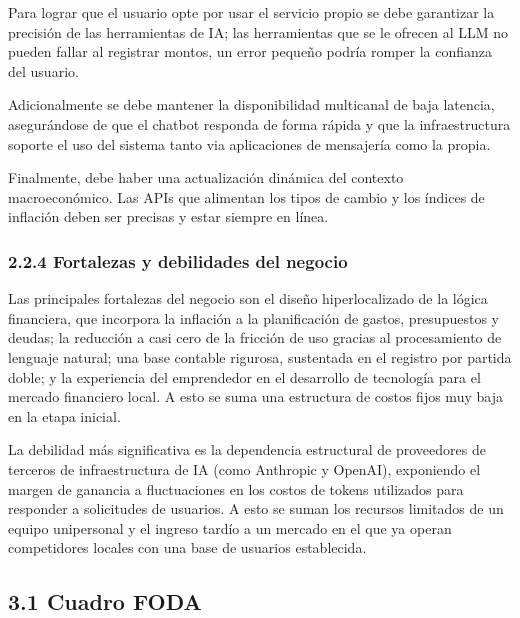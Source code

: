 Para lograr que el usuario opte por usar el servicio propio se debe
garantizar la precisión de las herramientas de IA; las herramientas que
se le ofrecen al LLM no pueden fallar al registrar montos, un error
pequeño podría romper la confianza del usuario.

Adicionalmente se debe mantener la disponibilidad multicanal de baja
latencia, asegurándose de que el chatbot responda de forma rápida y que
la infraestructura soporte el uso del sistema tanto via aplicaciones de
mensajería como la propia.

Finalmente, debe haber una actualización dinámica del contexto
macroeconómico. Las APIs que alimentan los tipos de cambio y los índices
de inflación deben ser precisas y estar siempre en línea.

\subsubsection*{2.2.4 Fortalezas y debilidades del
negocio}\label{fortalezas-y-debilidades-del-negocio}

Las principales fortalezas del negocio son el diseño hiperlocalizado de
la lógica financiera, que incorpora la inflación a la planificación de
gastos, presupuestos y deudas; la reducción a casi cero de la fricción
de uso gracias al procesamiento de lenguaje natural; una base contable
rigurosa, sustentada en el registro por partida doble; y la experiencia
del emprendedor en el desarrollo de tecnología para el mercado
financiero local. A esto se suma una estructura de costos fijos muy baja
en la etapa inicial.

La debilidad más significativa es la dependencia estructural de
proveedores de terceros de infraestructura de IA (como Anthropic y
OpenAI), exponiendo el margen de ganancia a fluctuaciones en los costos
de tokens utilizados para responder a solicitudes de usuarios. A esto se
suman los recursos limitados de un equipo unipersonal y el ingreso
tardío a un mercado en el que ya operan competidores locales con una
base de usuarios establecida.


\subsection*{3.1 Cuadro FODA}\label{cuadro-foda}

